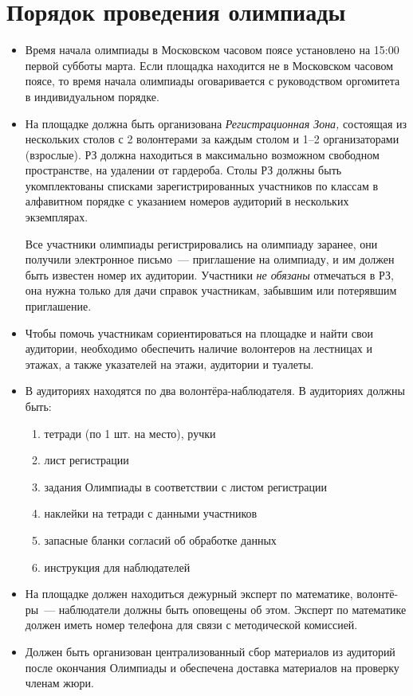 \documentclass[a4paper,12pt]{article}
\begin{document}
\section{Порядок проведения олимпиады}

\begin{itemize}
	\item Время начала олимпиады в Московском часовом поясе установлено на 15:00 первой субботы марта. Если площадка находится не в Московском часовом поясе, то время начала олимпиады оговаривается с руководством оргомитета в индивидуальном порядке.
	\item На площадке должна быть организована {\itshape Регистрационная Зона,} состоящая из нескольких столов с 2 волонтерами за каждым столом и 1–2 организаторами (взрослые). РЗ должна находиться в максимально возможном свободном пространстве, на удалении от гардероба. Столы РЗ должны быть укомплектованы списками зарегистрированных участников по классам в алфавитном порядке с указанием номеров аудиторий в нескольких экземплярах.

	Все участники олимпиады регистрировались на олимпиаду заранее, они получили электронное письмо~— приглашение на олимпиаду, и им должен быть известен номер их аудитории. Участники {\it не обязаны} отмечаться в РЗ, она нужна только для дачи справок участникам, забывшим или потерявшим приглашение.
	\item Чтобы помочь участникам сориентироваться на площадке и найти свои аудитории, необходимо обеспечить наличие волонтеров на лестницах и этажах, а также указателей на этажи, аудитории и туалеты.
	\item В аудиториях находятся по два волонтёра-наблюдателя. В аудиториях должны быть: \begin{enumerate}
		\item тетради (по 1 шт. на место), ручки
		\item лист регистрации
		\item задания Олимпиады в соответствии с листом регистрации
		\item наклейки на тетради с данными участников
		\item запасные бланки согласий об обработке данных
		\item инструкция для наблюдателей
	\end{enumerate}
	\item На площадке должен находиться дежурный эксперт по математике, волонтё-\linebreak ры~— наблюдатели должны быть оповещены об этом. Эксперт по математике должен иметь номер телефона для связи с методической комиссией.
	\item Должен быть организован централизованный сбор материалов из аудиторий после окончания Олимпиады и обеспечена доставка материалов на проверку членам жюри.
\end{itemize}
\end{document}
